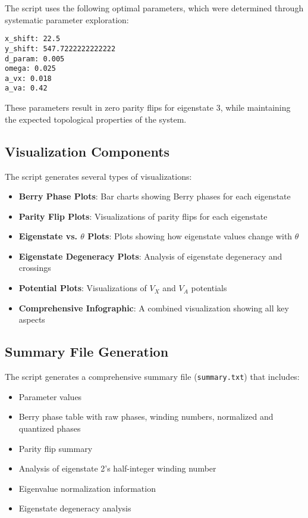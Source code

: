 \documentclass{article}
\begin{document}
The script uses the following optimal parameters, which were determined through systematic parameter exploration:

\begin{verbatim}
x_shift: 22.5
y_shift: 547.7222222222222
d_param: 0.005
omega: 0.025
a_vx: 0.018
a_va: 0.42
\end{verbatim}

These parameters result in zero parity flips for eigenstate 3, while maintaining the expected topological properties of the system.

\subsection{Visualization Components}

The script generates several types of visualizations:

\begin{itemize}
    \item \textbf{Berry Phase Plots}: Bar charts showing Berry phases for each eigenstate
    \item \textbf{Parity Flip Plots}: Visualizations of parity flips for each eigenstate
    \item \textbf{Eigenstate vs. $\theta$ Plots}: Plots showing how eigenstate values change with $\theta$
    \item \textbf{Eigenstate Degeneracy Plots}: Analysis of eigenstate degeneracy and crossings
    \item \textbf{Potential Plots}: Visualizations of $V_X$ and $V_A$ potentials
    \item \textbf{Comprehensive Infographic}: A combined visualization showing all key aspects
\end{itemize}

\subsection{Summary File Generation}

The script generates a comprehensive summary file (\texttt{summary.txt}) that includes:

\begin{itemize}
    \item Parameter values
    \item Berry phase table with raw phases, winding numbers, normalized and quantized phases
    \item Parity flip summary
    \item Analysis of eigenstate 2's half-integer winding number
    \item Eigenvalue normalization information
    \item Eigenstate degeneracy analysis
\end{itemize}
\end{document}

